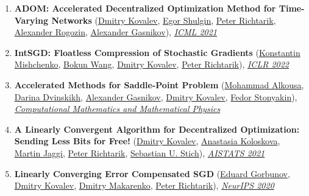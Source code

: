 \begin{enumerate}
\item \textbf{ADOM: Accelerated Decentralized Optimization Method for Time-Varying Networks} (\href{https://www.dmitry-kovalev.com}{\color{linkcolour}Dmitry Kovalev}, \href{https://shulgin-egor.github.io}{\color{linkcolour}Egor Shulgin}, \href{https://richtarik.org}{\color{linkcolour}Peter Richtarik}, \href{https://scholar.google.com/citations?user=sEjyzkgAAAAJ}{\color{linkcolour}Alexander Rogozin}, \href{https://scholar.google.ru/citations?user=AmeE8qkAAAAJ}{\color{linkcolour}Alexander Gasnikov}), \href{http://proceedings.mlr.press/v139/kovalev21a}{\em \color{black}ICML 2021}
\item \textbf{IntSGD: Floatless Compression of Stochastic Gradients} (\href{https://konstmish.github.io}{\color{linkcolour}Konstantin Mishchenko}, \href{https://bokunwang1.github.io}{\color{linkcolour}Bokun Wang}, \href{https://www.dmitry-kovalev.com}{\color{linkcolour}Dmitry Kovalev}, \href{https://richtarik.org}{\color{linkcolour}Peter Richtarik}), \href{https://openreview.net/forum?id=pFyXqxChZc}{\em \color{black}ICLR 2022}
\item \textbf{Accelerated Methods for Saddle-Point Problem} (\href{https://scholar.google.com/citations?user=dJgWojUAAAAJ}{\color{linkcolour}Mohammad Alkousa}, \href{https://scholar.google.com/citations?user=5ILnTRsAAAAJ}{\color{linkcolour}Darina Dvinskikh}, \href{https://scholar.google.ru/citations?user=AmeE8qkAAAAJ}{\color{linkcolour}Alexander Gasnikov}, \href{https://www.dmitry-kovalev.com}{\color{linkcolour}Dmitry Kovalev}, \href{https://www.researchgate.net/profile/Fedor_Stonyakin}{\color{linkcolour}Fedor Stonyakin}), \href{https://link.springer.com/article/10.1134/S0965542520110020}{\em \color{black}Computational Mathematics and Mathematical Physics}
\item \textbf{A Linearly Convergent Algorithm for Decentralized Optimization: Sending Less Bits for Free!} (\href{https://www.dmitry-kovalev.com}{\color{linkcolour}Dmitry Kovalev}, \href{https://scholar.google.com/citations?user=ldJpvE8AAAAJ}{\color{linkcolour}Anastasia Koloskova}, \href{https://people.epfl.ch/martin.jaggi}{\color{linkcolour}Martin Jaggi}, \href{https://richtarik.org}{\color{linkcolour}Peter Richtarik}, \href{https://sstich.ch}{\color{linkcolour}Sebastian U. Stich}), \href{http://proceedings.mlr.press/v130/kovalev21a}{\em \color{black}AISTATS 2021}
\item \textbf{Linearly Converging Error Compensated SGD} (\href{https://eduardgorbunov.github.io}{\color{linkcolour}Eduard Gorbunov}, \href{https://www.dmitry-kovalev.com}{\color{linkcolour}Dmitry Kovalev}, \href{}{\color{linkcolour}Dmitry Makarenko}, \href{https://richtarik.org}{\color{linkcolour}Peter Richtarik}), \href{https://papers.nips.cc/paper/2020/hash/ef9280fbc5317f17d480e4d4f61b3751-Abstract.html}{\em \color{black}NeurIPS 2020}

\end{enumerate}

